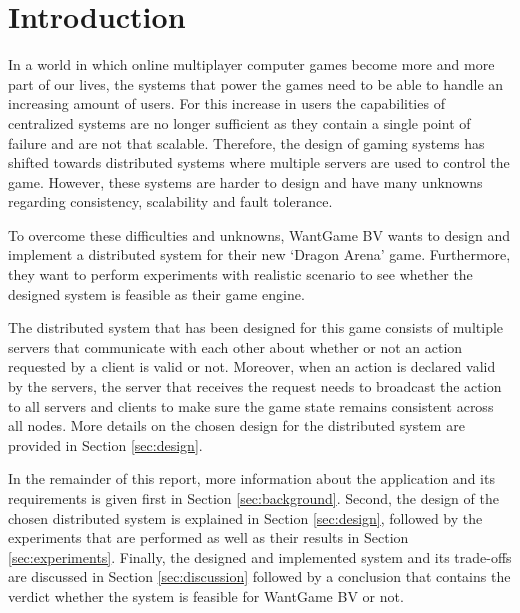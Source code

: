 \section{Introduction}
In a world in which online multiplayer computer games become more and more part of our lives, the systems that power the games need to be able to handle an increasing amount of users.
For this increase in users the capabilities of centralized systems are no longer sufficient as they contain a single point of failure and are not that scalable.
Therefore, the design of gaming systems has shifted towards distributed systems where multiple servers are used to control the game.
However, these systems are harder to design and have many unknowns regarding consistency, scalability and fault tolerance.

To overcome these difficulties and unknowns, WantGame BV wants to design and implement a distributed system for their new `Dragon Arena' game.
Furthermore, they want to perform experiments with realistic scenario to see whether the designed system is feasible as their game engine.

The distributed system that has been designed for this game consists of multiple servers that communicate with each other about whether or not an action requested by a client is valid or not. 
Moreover, when an action is declared valid by the servers, the server that receives the request needs to broadcast the action to all servers and clients to make sure the game state remains consistent across all nodes.
More details on the chosen design for the distributed system are provided in Section \ref{sec:design}.

In the remainder of this report, more information about the application and its requirements is given first in Section \ref{sec:background}. 
Second, the design of the chosen distributed system is explained in Section \ref{sec:design}, followed by the experiments that are performed as well as their results in Section \ref{sec:experiments}.
Finally, the designed and implemented system and its trade-offs are discussed in Section \ref{sec:discussion} followed by a conclusion that contains the verdict whether the system is feasible for WantGame BV or not.